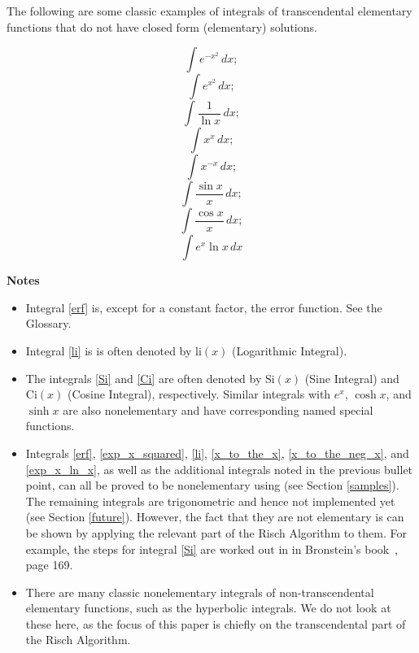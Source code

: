 \renewcommand{\thefootnote}{\fnsymbol{footnote}}	
The following are some classic examples of integrals of \gls{transcendental}
\gls{elementary} functions that do not have closed form (\gls{elementary})
solutions.

\begin{equation}
\label{erf}
\int{e^{-x^2}\,dx};
\end{equation}
\begin{equation}
\label{exp_x_squared}
\int{e^{x^2}\,dx};
\end{equation}
\begin{equation}
\label{li}
\int{\frac{1}{\ln{x}}\,dx};
\end{equation}
\begin{equation}
\label{x_to_the_x}
\int{x^x\,dx};
\end{equation}
\begin{equation}
\label{x_to_the_neg_x}
\int{x^{-x}\,dx};
\end{equation}
\begin{equation}
\label{Si}
\int{\frac{\sin{x}}{x}\,dx};
\end{equation}
\begin{equation}
\label{Ci}
\int{\frac{\cos{x}}{x}\,dx};
\end{equation}
\begin{equation}
\label{exp_x_ln_x}
\int{e^x\ln{x}\,dx}
\end{equation}

\textbf{Notes}
\begin{itemize}
\item Integral \ref{erf} is, except for a constant factor, the
\gls{error function}.  See the Glossary.
\item Integral \ref{li} is is often denoted by $\mathrm{li}(x)$
(Logarithmic Integral).
\item The integrals \ref{Si} and \ref{Ci} are often denoted by
$\mathrm{Si}(x)$ (Sine Integral) and $\mathrm{Ci}(x)$ (Cosine Integral),
respectively.  Similar integrals with $e^x$, $\cosh{x}$, and $\sinh{x}$
are also nonelementary and have corresponding named special functions.
\item Integrals \ref{erf}, \ref{exp_x_squared}, \ref{li},
\ref{x_to_the_x}, \ref{x_to_the_neg_x}, and \ref{exp_x_ln_x}, as well as
the additional integrals noted in the previous bullet point, can all be
proved to be nonelementary using \rischintegrate{} (see Section \ref{samples}).
The remaining integrals are trigonometric and hence not implemented yet
(see Section \ref{future}).  However, the fact that they are not
\gls{elementary} is can be shown by applying the relevant part of the Risch
Algorithm to them. For example, the steps  for integral \ref{Si} are
worked out in in Bronstein's book~\cite{bronstein2005symbolic}, page 169.
\item There are many classic nonelementary integrals of
non-\gls{transcendental} \gls{elementary} functions, such as the hyperbolic
integrals.  We do not look at these here, as the focus of this paper is
chiefly on the \gls{transcendental} part of the Risch Algorithm.
\end{itemize}